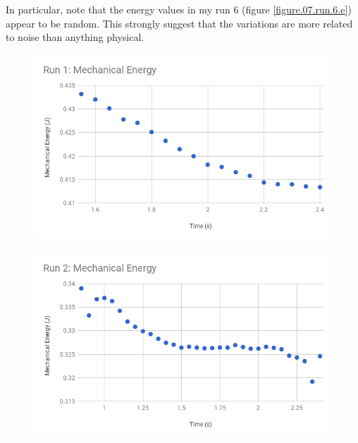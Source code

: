 In particular, note that the energy values in my run 6 (figure \ref{figure.07.run.6.e}) appear to be random. This strongly suggest that the variations are more related to noise than anything physical.
\begin{figure}
    \centering
    \includegraphics[scale=0.71]{image/07-mechanic/run-1-energy.png}
    \caption{}
    \label{figure.07.run.1.e}
\end{figure}
\begin{figure}
    \centering
    \includegraphics[scale=0.71]{image/07-mechanic/run-2-energy.png}
    \caption{}
    \label{figure.07.run.2.e}
\end{figure}
